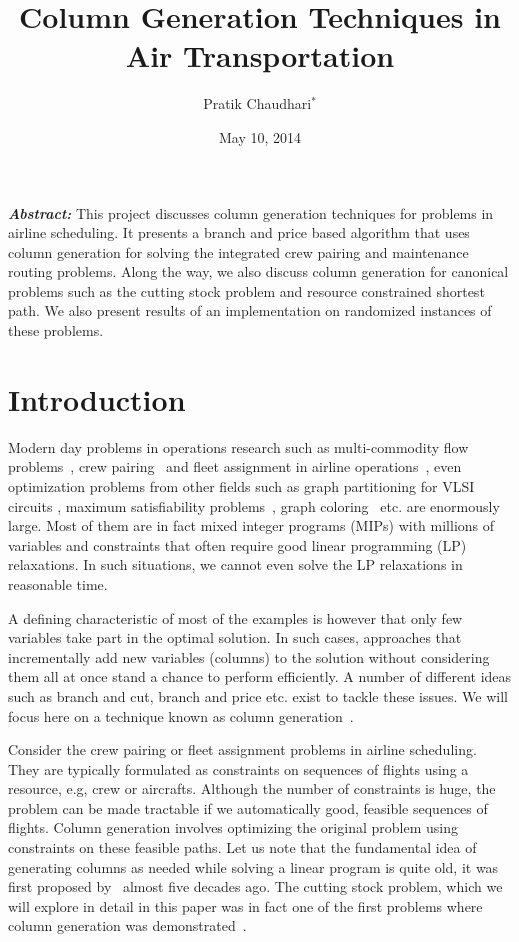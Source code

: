 \documentclass[letterpaper, 10pt, twocolumn, reqno]{amsart}
\title{Column Generation Techniques in Air Transportation}
\author{Pratik Chaudhari$^*$}
\date{May 10, 2014}
\begin{document}
\maketitle

{
\small
\textbf{\emph{Abstract:}}
This project discusses column generation techniques for problems in airline scheduling. It presents a branch and price based algorithm that uses column generation for solving the integrated crew pairing and maintenance routing problems. Along the way, we also discuss column generation for canonical problems such as the cutting stock problem and resource constrained shortest path. We also present results of an implementation on randomized instances of these problems.
}

\section{Introduction}
\label{sec:intro}


Modern day problems in operations research such as multi-commodity flow problems~\cite{barnhart2000using}, crew pairing~\cite{anbil1998column} and fleet assignment in
airline operations~\cite{barnhart1998flight}, even optimization problems from other fields such as graph partitioning for VLSI circuits \cite{vanderbeck1994thesis}, maximum satisfiability problems~\cite{hansen1998mixed}, graph coloring~\cite{mehrotra1996column} etc. are enormously large.
Most of them are in fact mixed integer programs (MIPs) with millions of variables and constraints that often require good linear programming (LP)
relaxations. In such situations, we cannot even solve the LP relaxations in reasonable time.

A defining characteristic of most of the examples is however that only few variables take part in the optimal solution. In such cases, approaches that
incrementally add new variables (columns) to the solution without considering them all at once stand a chance to perform efficiently. A number of different
ideas such as branch and cut, branch and price etc. exist to tackle these issues. We will focus here on a technique known as column generation~\cite{desrosiers2005primer}.

Consider the crew pairing or fleet assignment problems in airline scheduling. They are typically formulated as constraints on sequences of flights using a resource, e.g, crew or aircrafts. Although the number of constraints is huge, the problem can be made tractable if we automatically good, feasible sequences of flights. Column generation involves optimizing the original problem using constraints on these feasible paths. Let us note that the fundamental idea of generating columns as needed while solving a linear program is quite old, it was first proposed by~\cite{dantzig1960decomposition} almost five decades ago. The cutting stock problem, which we will explore in detail in this paper was in fact one of the first problems where column generation was demonstrated~\cite{gilmore1961linear,gilmore1963linear}.
\end{document}
